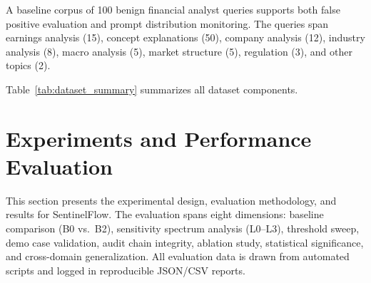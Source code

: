 \documentclass[journal]{IEEEtran}
\begin{document}
A baseline corpus of 100 benign financial analyst queries supports both false positive evaluation and prompt distribution monitoring. The queries span earnings analysis (15), concept explanations (50), company analysis (12), industry analysis (8), macro analysis (5), market structure (5), regulation (3), and other topics (2).

Table~\ref{tab:dataset_summary} summarizes all dataset components.

\begin{table}[!ht]
    \centering
    \caption{Dataset Summary}
    \label{tab:dataset_summary}
\end{table}




\section{Experiments and Performance Evaluation}
\label{Sect:Experimental_Procedure_Performance_Evaluation}
%
This section presents the experimental design, evaluation methodology, and results for SentinelFlow. The evaluation spans eight dimensions: baseline comparison (B0 vs.\ B2), sensitivity spectrum analysis (L0--L3), threshold sweep, demo case validation, audit chain integrity, ablation study, statistical significance, and cross-domain generalization. All evaluation data is drawn from automated scripts and logged in reproducible JSON/CSV reports.

\end{document}
